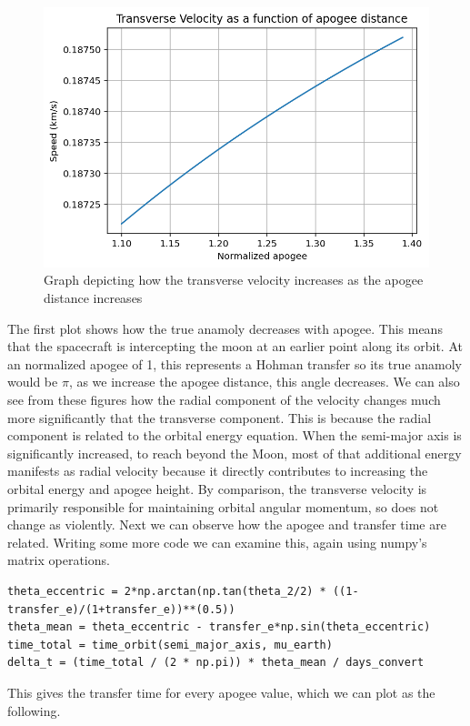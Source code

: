 \documentclass[12pt,twocolumn]{article}  %
\begin{document}
\begin{figure}[H]
\begin{minipage}{0.48\textwidth}
    \end{minipage}
    \hfill
    \begin{minipage}{0.48\textwidth}
        \centering
        \includegraphics[width=\textwidth]{Images/221-trans.png}
        \caption{Graph depicting how the transverse velocity increases as the apogee distance increases}
    \end{minipage}
\end{figure}
The first plot shows how the true anamoly decreases with apogee. This means that the spacecraft
is intercepting the moon at an earlier point along its orbit. At an normalized apogee of 1, this represents
a Hohman transfer so its true anamoly would be $\pi$, as we increase the apogee distance, this angle decreases.
\vspace{0.75cm}
\newline
We can also see from these figures how the radial component of the velocity 
changes much more significantly that the transverse component.
This is because the radial component is related
 to the orbital energy equation. When the 
semi-major axis is significantly increased, 
to reach beyond the Moon, most of that additional energy 
manifests as radial velocity because it 
directly contributes to increasing the orbital energy and apogee height.
By comparison, the transverse velocity is primarily responsible 
for maintaining orbital angular momentum, so does not change as violently.
\vspace{0.75cm}
\newline
Next we can observe how the apogee and transfer time are related.
Writing some more code we can examine this, again using numpy's matrix operations.
\begin{lstlisting}
theta_eccentric = 2*np.arctan(np.tan(theta_2/2) * ((1-transfer_e)/(1+transfer_e))**(0.5))
theta_mean = theta_eccentric - transfer_e*np.sin(theta_eccentric)
time_total = time_orbit(semi_major_axis, mu_earth)
delta_t = (time_total / (2 * np.pi)) * theta_mean / days_convert
\end{lstlisting}
This gives the transfer time for every apogee value, which we can plot as the following.
\end{document}

